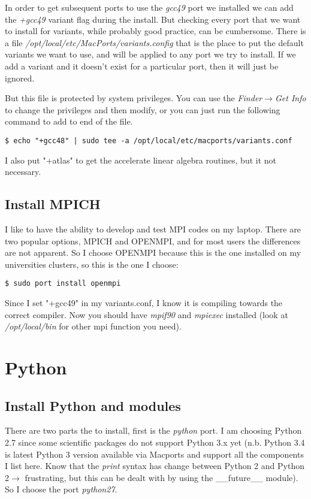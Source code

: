 \documentclass[11pt]{article}
\begin{document}
In order to get subsequent ports to use the \textit{gcc49} port we installed we can add the \textit{+gcc49} variant flag during the install. But checking every port that we want to install for variants, while probably good practice, can be cumbersome. There is a file \textit{/opt/local/etc/MacPorts/variants.config} that is the place to put the default variants we want to use, and will be applied to any port we try to install. If we add a variant and it doesn't exist for a particular port, then it will just be ignored.  

But this file is protected by system privileges. You can use the \textit{Finder$\rightarrow$Get Info} to change the privileges and then modify, or you can just run the following command to add to end of the file.
\begin{lstlisting}[style=Bash]
$ echo "+gcc48" | sudo tee -a /opt/local/etc/macports/variants.conf
\end{lstlisting}
I also put "+atlas" to get the accelerate linear algebra routines, but it not necessary.


\subsection{Install MPICH}
I like to have the ability to develop and test MPI codes on my laptop. There are two popular options, MPICH and OPENMPI, and for most users the differences are not apparent. So I choose OPENMPI because this is the one installed on my universities clusters, so this is the one I choose:
\begin{lstlisting}[style=Bash]
$ sudo port install openmpi
\end{lstlisting}
Since I set "+gcc49" in my variants.conf, I know it is compiling towards the correct compiler. Now you should have \textit{mpif90} and \textit{mpiexec} installed (look at \textit{/opt/local/bin} for other mpi function you need).



%
%
\section{Python}
\subsection{Install Python and modules}
There are two parts the to install, first is the \textit{python} port.  I am choosing Python 2.7 since some scientific packages do not support Python 3.x yet (n.b. Python 3.4 is latest Python 3 version available via Macports and support all the components I list here. Know that the  \textit{print} syntax has change between Python 2 and Python 2$\rightarrow$ frustrating, but this can be dealt with by using the \_\_future\_\_ module). So I choose the port \textit{python27}. 
\end{document}

